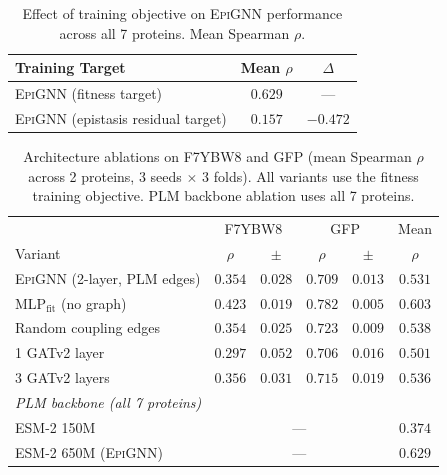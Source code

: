 \documentclass{article}
\newcommand{\epignn}{\textsc{EpiGNN}}
\newcommand{\ftmlp}{MLP$_\text{fit}$}
\begin{document}
\begin{table}[t]
\centering
\caption{Effect of training objective on \epignn{} performance across all 7 proteins. Mean Spearman $\rho$.}
\label{tab:ablation_objective}
\begin{tabular}{lcc}
\toprule
Training Target & Mean $\rho$ & $\Delta$ \\
\midrule
\epignn{} (fitness target) & $0.629$ & --- \\
\epignn{} (epistasis residual target) & $0.157$ & $-0.472$ \\
\bottomrule
\end{tabular}
\end{table}

\begin{table}[t]
\centering
\caption{Architecture ablations on F7YBW8 and GFP (mean Spearman $\rho$ across 2 proteins, 3 seeds $\times$ 3 folds). All variants use the fitness training objective. PLM backbone ablation uses all 7 proteins.}
\label{tab:ablation_arch}
\begin{tabular}{lccccc}
\toprule
 & \multicolumn{2}{c}{F7YBW8} & \multicolumn{2}{c}{GFP} & Mean \\
Variant & $\rho$ & $\pm$ & $\rho$ & $\pm$ & $\rho$ \\
\midrule
\epignn{} (2-layer, PLM edges) & $0.354$ & $0.028$ & $0.709$ & $0.013$ & $0.531$ \\
\ftmlp{} (no graph) & $\mathbf{0.423}$ & $0.019$ & $\mathbf{0.782}$ & $0.005$ & $\mathbf{0.603}$ \\
Random coupling edges & $0.354$ & $0.025$ & $0.723$ & $0.009$ & $0.538$ \\
1 GATv2 layer & $0.297$ & $0.052$ & $0.706$ & $0.016$ & $0.501$ \\
3 GATv2 layers & $0.356$ & $0.031$ & $0.715$ & $0.019$ & $0.536$ \\
\midrule
\multicolumn{6}{l}{\emph{PLM backbone (all 7 proteins)}} \\
ESM-2 150M & \multicolumn{4}{c}{---} & $0.374$ \\
ESM-2 650M (\epignn{}) & \multicolumn{4}{c}{---} & $0.629$ \\
\bottomrule
\end{tabular}
\end{table}
\end{document}
